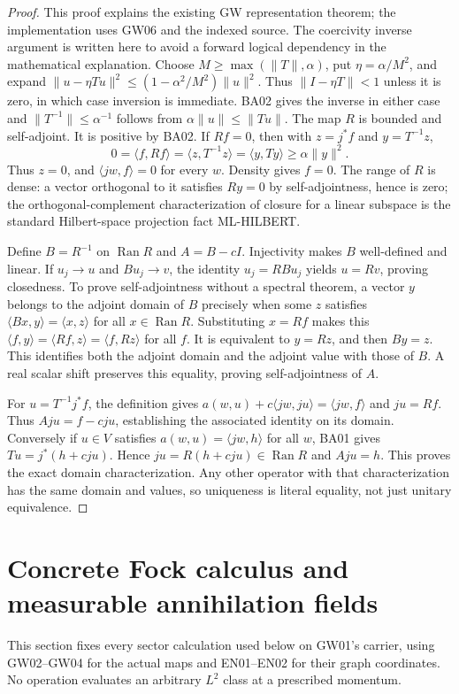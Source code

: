 \documentclass[11pt,a4paper]{article}
\theoremstyle{remark}\newtheorem{remark}[theorem]{Remark}
\begin{document}
\begin{proof}
This proof explains the existing GW representation theorem; the implementation uses GW06 and the indexed source. The coercivity inverse argument is written here to avoid a forward logical dependency in the mathematical explanation. Choose $M\geq\max(\|T\|,\alpha)$, put $\eta=\alpha/M^2$, and expand
$\|u-\eta Tu\|^2\leq(1-\alpha^2/M^2)\|u\|^2$. Thus $\|I-\eta T\|<1$ unless it is zero, in which case inversion is immediate. BA02 gives the inverse in either case and $\|T^{-1}\|\leq\alpha^{-1}$ follows from $\alpha\|u\|\leq\|Tu\|$. The map $R$ is bounded and self-adjoint. It is positive by BA02. If $Rf=0$, then with $z=j^*f$ and $y=T^{-1}z$,
\[
 0=\langle f,Rf\rangle=\langle z,T^{-1}z\rangle
   =\langle y,Ty\rangle\geq\alpha\|y\|^2.
\]
Thus $z=0$, and $\langle jw,f\rangle=0$ for every $w$. Density gives $f=0$. The range of $R$ is dense: a vector orthogonal to it satisfies $Ry=0$ by self-adjointness, hence is zero; the orthogonal-complement characterization of closure for a linear subspace is the standard Hilbert-space projection fact ML-HILBERT.

Define $B=R^{-1}$ on $\operatorname{Ran}R$ and $A=B-cI$. Injectivity makes $B$ well-defined and linear. If $u_j\to u$ and $Bu_j\to v$, the identity $u_j=RBu_j$ yields $u=Rv$, proving closedness. To prove self-adjointness without a spectral theorem, a vector $y$ belongs to the adjoint domain of $B$ precisely when some $z$ satisfies $\langle Bx,y\rangle=\langle x,z\rangle$ for all $x\in\operatorname{Ran}R$. Substituting $x=Rf$ makes this
$\langle f,y\rangle=\langle Rf,z\rangle=\langle f,Rz\rangle$ for all $f$. It is equivalent to $y=Rz$, and then $By=z$. This identifies both the adjoint domain and the adjoint value with those of $B$. A real scalar shift preserves this equality, proving self-adjointness of $A$.

For $u=T^{-1}j^*f$, the definition gives
$a(w,u)+c\langle jw,ju\rangle=\langle jw,f\rangle$ and $ju=Rf$. Thus $Aju=f-cju$, establishing the associated identity on its domain. Conversely if $u\in V$ satisfies $a(w,u)=\langle jw,h\rangle$ for all $w$, BA01 gives $Tu=j^*(h+cju)$. Hence $ju=R(h+cju)\in\operatorname{Ran}R$ and $Aju=h$. This proves the exact domain characterization. Any other operator with that characterization has the same domain and values, so uniqueness is literal equality, not just unitary equivalence.
\end{proof}


\section{Concrete Fock calculus and measurable annihilation fields}\label{sec:fockdetail}
This section fixes every sector calculation used below on GW01's carrier, using GW02--GW04 for the actual maps and EN01--EN02 for their graph coordinates. No operation evaluates an arbitrary $L^2$ class at a prescribed momentum.
\end{document}
